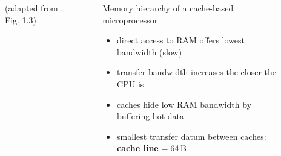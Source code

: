 \documentclass[9pt,xcolor=table]{beamer}
\begin{document}
\begin{frame}
\begin{columns}[c]
\begin{column}{.45\textwidth}
\begin{figure}[htb]
      (adapted from \cite{HagerWelleinIntroHPC}, Fig. 1.3)
    \end{figure}
  \end{column}
  \begin{column}{.45\textwidth}
    \vfill
    \begin{block}{Memory hierarchy of a cache-based microprocessor}
      \begin{itemize}
      \item direct access to RAM offers lowest bandwidth (slow)
      \item transfer bandwidth increases the closer the CPU is
      \item caches hide low RAM bandwidth by buffering hot data
      \item smallest transfer datum between caches:
        \textbf{cache line} $= \unit[64]{B}$
      \end{itemize}
    \end{block}
    \vfill

\end{column}
\end{columns}
\end{frame}
\end{document}
